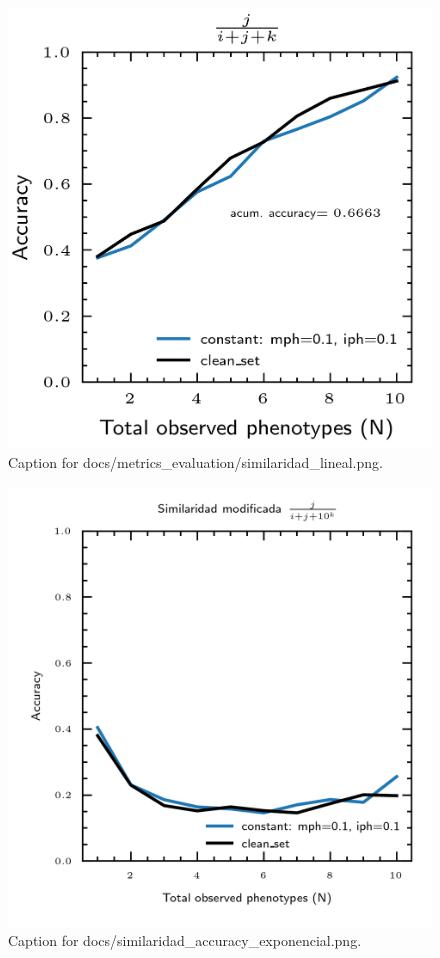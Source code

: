 \documentclass{article}
\begin{document}
\begin{figure}[h] \centering \includegraphics{docs/metrics_evaluation/similaridad_lineal.png} \caption{Caption for docs/metrics_evaluation/similaridad_lineal.png.} \end{figure}
\begin{figure}[h] \centering \includegraphics{docs/similaridad_accuracy_exponencial.png} \caption{Caption for docs/similaridad_accuracy_exponencial.png.} \end{figure}
\end{document}
